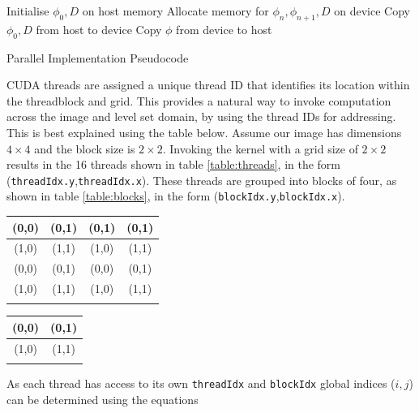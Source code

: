 	
\begin{algorithm}[h]
\dontprintsemicolon
\BlankLine
\SetLine
Initialise $\phi_0, D$ on host memory\;
Allocate memory for $\phi_n ,\phi_{n+1}, D$ on device\;
Copy $\phi_0 , D$ from host to device\;
Copy $\phi$ from device to host\;
\caption{Parallel Implementation Pseudocode}\label{alg:cuda1}
\end{algorithm}	

CUDA threads are assigned a unique thread ID that identifies its location within the threadblock and grid. This provides a natural way to invoke computation across the image and level set domain, by using the thread IDs for addressing.  This is best explained using the table below. Assume our image has dimensions $4\times 4$ and the block size is $2 \times 2$. Invoking the kernel with a grid size of $2 \times 2$ results in the 16 threads shown in table \ref{table:threads}, in the form (\texttt{threadIdx.y},\texttt{threadIdx.x}). These threads are grouped into blocks of four, as shown in table \ref{table:blocks}, in the form (\texttt{blockIdx.y},\texttt{blockIdx.x}). 
\begin{center}
  \begin{tabular}{ | c | c || c | c |}
    \hline
    (0,0) & (0,1) & (0,1) & (0,1) \\ \hline
    (1,0) & (1,1) & (1,0) & (1,1) \\ \hline\hline
    (0,0) & (0,1) & (0,0) & (0,1) \\ \hline
    (1,0) & (1,1) & (1,0) & (1,1) \\
    \label{table:threads}
  \end{tabular}
\end{center}

\begin{center}
  \begin{tabular}{ | c | c |}
    \hline
    (0,0) & (0,1)  \\ \hline
    (1,0) & (1,1)  \\ 
    \label{table:blocks}
  \end{tabular}
\end{center}

As each thread has access to its own \texttt{threadIdx} and \texttt{blockIdx} global indices ($i,j$) can be determined using the equations

